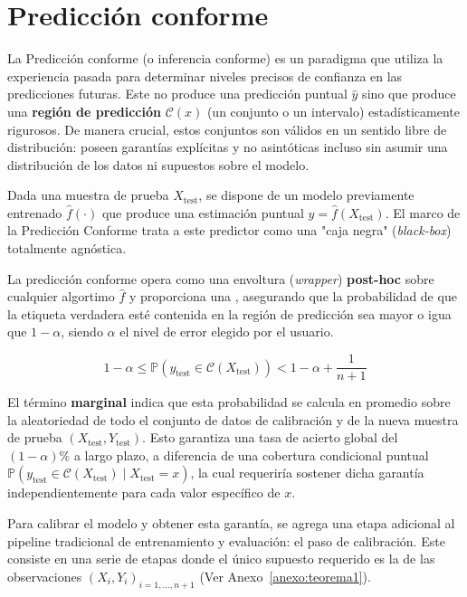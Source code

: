 \section{Predicción conforme}

%
La Predicción conforme (o inferencia conforme) es un paradigma que utiliza la experiencia pasada para determinar niveles precisos de confianza en las predicciones futuras.
Este no produce una predicción puntual $\hat{y}$ sino que produce una \textbf{región de predicción} $\mathcal{C}(x)$ (un conjunto o un intervalo) estadísticamente rigurosos.
De manera crucial, estos conjuntos son válidos en un sentido libre de distribución: poseen garantías explícitas y no asintóticas incluso sin asumir una distribución de los datos ni supuestos sobre el modelo.


Dada una muestra de prueba $X_{\text{test}}$, se dispone de un modelo previamente entrenado $\hat{f}(\cdot)$ que produce una estimación puntual $\hat{y} = \hat{f}(X_{\text{test}})$. El marco de la Predicción Conforme trata a este predictor como una "caja negra" (\textit{black-box}) totalmente agnóstica.


La predicción conforme opera como una envoltura (\textit{wrapper}) \textbf{post-hoc} sobre cualquier algortimo $\hat{f}$ y proporciona una , asegurando que la probabilidad de que la etiqueta verdadera esté contenida en la región de predicción sea mayor o igua que $1 - \alpha$, siendo $\alpha$ el nivel de error elegido por el usuario.

\begin{equation}
1-\alpha \le
\mathbb{P}(y_{\text{test}} \in \mathcal{C}(X_{\text{test}})) <  1-\alpha + \frac{1}{n+1}
\end{equation}



El término \textbf{marginal} indica que esta probabilidad se calcula en promedio sobre la aleatoriedad de todo el conjunto de datos de calibración y de la nueva muestra de prueba $(X_{\text{test}}, Y_{\text{test}})$. Esto garantiza una tasa de acierto global del $(1-\alpha)\%$ a largo plazo, a diferencia de una cobertura condicional puntual $\mathbb{P}(y_{\text{test}} \in \mathcal{C}(X_{\text{test}}) \mid X_{\text{test}} = x)$, la cual requeriría sostener dicha garantía independientemente para cada valor específico de $x$.

Para calibrar el modelo y obtener esta garantía, se agrega una etapa adicional al pipeline tradicional de entrenamiento y evaluación: el paso de calibración. Este consiste en una serie de etapas donde el único supuesto requerido es la  de las observaciones $(X_i, Y_i)_{i=1,\dots,n+1}$ (Ver Anexo~\ref{anexo:teorema1}).









